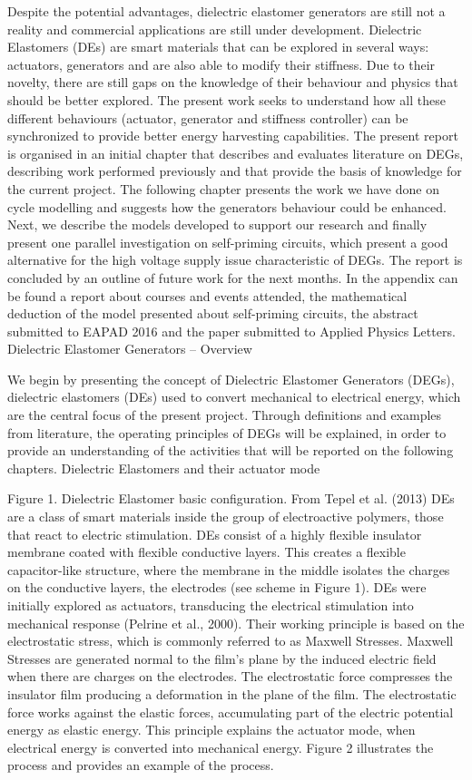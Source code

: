 Despite the potential advantages, dielectric elastomer generators are still not a reality and commercial applications are still under development. Dielectric Elastomers (DEs) are smart materials that can be explored in several ways: actuators, generators and are also able to modify their stiffness. Due to their novelty, there are still gaps on the knowledge of their behaviour and physics that should be better explored.   The present work seeks to understand how all these different behaviours (actuator, generator and stiffness controller) can be synchronized to   provide better energy harvesting capabilities. 
The present report is organised in an initial chapter that describes and evaluates literature on DEGs, describing work performed previously and that provide the basis of knowledge for the current project. The following chapter presents the work we have done on cycle modelling and suggests how the generators behaviour could be enhanced.  Next, we describe the models developed to support our research and finally present one parallel investigation on self-priming circuits, which present a good alternative for the high voltage supply issue characteristic of DEGs. The report is concluded by an outline of future work for the next months.
In the appendix can be found a report about courses and events attended, the mathematical deduction of the model presented about self-priming circuits, the abstract submitted to EAPAD 2016 and the paper submitted to Applied Physics Letters. 
Dielectric Elastomer Generators – Overview

We begin by presenting the concept of Dielectric Elastomer Generators (DEGs), dielectric elastomers (DEs) used to convert mechanical to electrical energy, which are the central focus of the present project. Through definitions and examples from literature, the operating principles of DEGs will be explained, in order to provide an understanding of the activities that will be reported on the following chapters.
Dielectric Elastomers and their actuator mode

 
Figure 1. Dielectric Elastomer basic configuration. From Tepel et al. (2013)
DEs are a class of smart materials inside the group of electroactive polymers, those that react to electric stimulation. DEs consist of a highly flexible insulator membrane coated with flexible conductive layers. This creates a flexible capacitor-like structure, where the membrane in the middle isolates the charges on the conductive layers, the electrodes (see scheme in Figure 1). DEs were initially explored as actuators, transducing the electrical stimulation into mechanical response (Pelrine et al., 2000). Their working principle is based on the electrostatic stress, which is commonly referred to as Maxwell Stresses. Maxwell Stresses are generated normal to the film’s plane by the induced electric field when there are charges on the electrodes. The electrostatic force compresses the insulator film producing a deformation in the plane of the film. The electrostatic force works against the elastic forces, accumulating part of the electric potential energy as elastic energy. This principle explains the actuator mode, when electrical energy is converted into mechanical energy.  Figure 2 illustrates the process and provides an example of the process.
 
